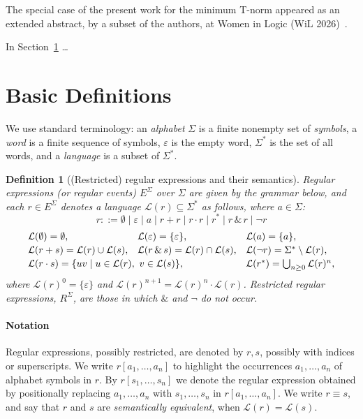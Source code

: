 \documentclass{article}
\newtheorem{definition}{Definition}[section]
\begin{document}
The special case of the present work for the minimum T-norm appeared as an extended abstract, by a subset of the authors, at Women in Logic (WiL 2026)~\cite{KM26}.\vspace{1cm}

 In Section~\ref{basic} \ldots

\section{Basic Definitions}\label{basic}
We use standard terminology: an \emph{alphabet} $\Sigma$ is a finite nonempty set of
\emph{symbols}, a \emph{word} is a finite sequence of symbols, $\varepsilon$ is the empty
word, $\Sigma^*$ is the set of all words, and a \emph{language} is a subset of $\Sigma^*$.

\begin{definition}[(Restricted) regular expressions and their semantics]
\label{def:regex}
\emph{Regular expressions} (or \emph{regular events}) $E^\Sigma$ over $\Sigma$ are given by
the grammar below, and each $r\in E^\Sigma$ denotes a language
$\mathcal L(r)\subseteq\Sigma^*$ as follows, where $a\in\Sigma$:
\[
r ::= \emptyset \mid \varepsilon \mid a \mid r+r \mid r\cdot r \mid r^* \mid r \,\&\, r \mid \neg r
\]
\[
\begin{array}{l@{\quad}l@{\quad}l}
\mathcal{L}(\emptyset) = \emptyset, &
\mathcal{L}(\varepsilon) = \{\varepsilon\}, &
\mathcal{L}(a) = \{a\},\\[0.5ex]
\mathcal{L}(r + s) = \mathcal{L}(r) \cup \mathcal{L}(s), &
\mathcal{L}(r \,\&\, s) = \mathcal{L}(r) \cap \mathcal{L}(s), &
\mathcal{L}(\neg r) = \Sigma^* \setminus \mathcal{L}(r),\\[0.5ex]
\multicolumn{2}{l}{\mathcal{L}(r \cdot s) = \{uv \mid u \in \mathcal{L}(r),\ v \in \mathcal{L}(s)\},} &
\mathcal{L}(r^*) = \bigcup_{n \geq 0} \mathcal{L}(r)^n,
\end{array}
\]
where $\mathcal{L}(r)^0 = \{\varepsilon\}$ and
$\mathcal{L}(r)^{n+1} = \mathcal{L}(r)^n \cdot \mathcal{L}(r)$.
\emph{Restricted} regular expressions, $R^\Sigma$, are those in which $\&$ and $\neg$ do
not occur.
\end{definition}

\paragraph{Notation} Regular expressions, possibly restricted, are denoted by $r,s$, possibly with indices or superscripts. We write $r[a_1,\ldots,a_n]$ to highlight the occurrences $a_1,\ldots,a_n$ of alphabet symbols in $r$. By $r[s_1,\ldots,s_n]$ we denote the regular expression obtained by positionally replacing $a_1,\ldots,a_n$ with $s_1,\ldots,s_n$ in $r[a_1,\ldots,a_n]$. We write $r\equiv s$, and say that $r$ and $s$ are \emph{semantically equivalent}, when $\mathcal L(r)=\mathcal L(s)$.\smallskip
\end{document}
